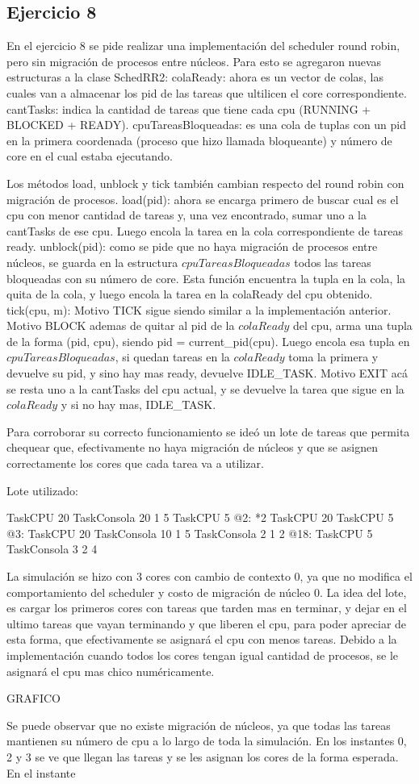 \subsection{Ejercicio 8}

En el ejercicio 8 se pide realizar una implementación del scheduler round robin, pero sin migración de procesos entre núcleos.
Para esto se agregaron nuevas estructuras a la clase SchedRR2:
colaReady: ahora es un vector de colas, las cuales van a almacenar los pid de las tareas que ultilicen el core correspondiente.
cantTasks: indica la cantidad de tareas que tiene cada cpu (RUNNING + BLOCKED + READY).
cpuTareasBloqueadas: es una cola de tuplas con un pid en la primera coordenada (proceso que hizo llamada bloqueante) y número de core en el cual estaba ejecutando.

Los métodos load, unblock y tick también cambian respecto del round robin con migración de procesos.
load(pid): ahora se encarga primero de buscar cual es el cpu con menor cantidad de tareas y, una vez encontrado, sumar uno a la cantTasks de ese cpu. Luego encola la tarea en la cola correspondiente de tareas ready.
unblock(pid): como se pide que no haya migración de procesos entre núcleos, se guarda en la estructura $cpuTareasBloqueadas$ todos las tareas bloqueadas con su número de 
core. Esta función encuentra la tupla en la cola, la quita de la cola, y luego encola la tarea en la colaReady del cpu obtenido.
tick(cpu, m): 
Motivo TICK sigue siendo similar a la implementación anterior.
Motivo BLOCK ademas de quitar al pid de la $colaReady$ del cpu, arma una tupla de la forma (pid, cpu), siendo pid = current_pid(cpu). Luego encola esa tupla en $cpuTareasBloqueadas$, 
si quedan tareas en la $colaReady$ toma la primera y devuelve su pid, y sino hay mas ready, devuelve IDLE_TASK.
Motivo EXIT acá se resta uno a la cantTasks del cpu actual, y se devuelve la tarea que sigue en la $colaReady$ y si no hay mas, IDLE_TASK.

Para corroborar su correcto funcionamiento se ideó un lote de tareas que permita chequear que, efectivamente no haya migración de núcleos y que se asignen correctamente 
los cores que cada tarea va a utilizar. 

Lote utilizado:

TaskCPU 20		
TaskConsola 20	1 5	
TaskCPU 5
@2: 
*2 TaskCPU 20
TaskCPU 5
@3:
TaskCPU 20
TaskConsola 10 1 5
TaskConsola 2 1 2
@18:				
TaskCPU 5
TaskConsola 3 2 4

La simulación se hizo con 3 cores con cambio de contexto 0, ya que no modifica el comportamiento del scheduler y costo de migración de núcleo 0.
La idea del lote, es cargar los primeros cores con tareas que tarden mas en terminar, y dejar en el ultimo tareas que vayan terminando y que liberen el cpu, 
para poder apreciar de esta forma, que efectivamente se asignará el cpu con menos tareas.
Debido a la implementación cuando todos los cores tengan igual cantidad de procesos, se le asignará el cpu mas chico numéricamente. 

GRAFICO

Se puede observar que no existe migración de núcleos, ya que todas las tareas mantienen su número de cpu a lo largo de toda la simulación.
En los instantes 0, 2 y 3 se ve que llegan las tareas y se les asignan los cores de la forma esperada. En el instante 









